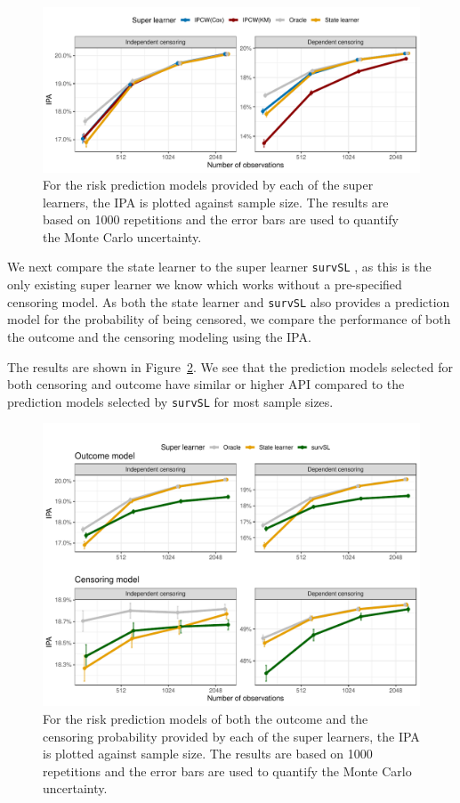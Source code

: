 \documentclass{statsoc}
\numberwithin{theorem}{section}
\newcommand{\1}{\mathds{1}}
\begin{document}
\begin{figure}
  \centerline{\includegraphics[width=1\linewidth]{./experiment-fig-sl-ipcw.pdf}}
  \caption[]{For the risk prediction models provided by each of the super
    learners, the IPA is plotted against sample size. The results are based on
    1000 repetitions and the error bars are used to quantify the Monte Carlo
    uncertainty.}
  \label{fig:ipcw-fail}
\end{figure}

We next compare the state learner to the super learner \texttt{survSL}
\citep{westling2021inference}, as this is the only existing super learner we
know which works without a pre-specified censoring model. As both the state
learner and \texttt{survSL} also provides a prediction model for the probability
of being censored, we compare the performance of both the outcome and the
censoring modeling using the IPA.

The results are shown in Figure~\ref{fig:zelefski}. We see that the prediction
models selected for both censoring and outcome have similar or higher API
compared to the prediction models selected by \texttt{survSL} for most sample
sizes.

\begin{figure}
  \centerline{\includegraphics[width=1\linewidth]{./experiment-fig-sl-survSL.pdf}}
  \caption[]{For the risk prediction models of both the outcome and the
    censoring probability provided by each of the super learners, the IPA is
    plotted against sample size. The results are based on 1000 repetitions and
    the error bars are used to quantify the Monte Carlo uncertainty.}
  \label{fig:zelefski}
\end{figure}
\end{document}
